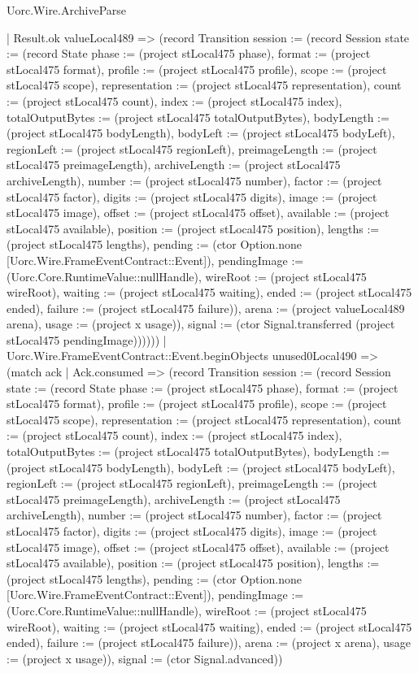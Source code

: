 \begin{lexlean}{Uorc.Wire.ArchiveParse}
\begin{semanticmodule}
{            | Result.ok valueLocal489 => (record Transition {session := (record Session {state := (record State {phase := (project stLocal475 phase), format := (project stLocal475 format), profile := (project stLocal475 profile), scope := (project stLocal475 scope), representation := (project stLocal475 representation), count := (project stLocal475 count), index := (project stLocal475 index), totalOutputBytes := (project stLocal475 totalOutputBytes), bodyLength := (project stLocal475 bodyLength), bodyLeft := (project stLocal475 bodyLeft), regionLeft := (project stLocal475 regionLeft), preimageLength := (project stLocal475 preimageLength), archiveLength := (project stLocal475 archiveLength), number := (project stLocal475 number), factor := (project stLocal475 factor), digits := (project stLocal475 digits), image := (project stLocal475 image), offset := (project stLocal475 offset), available := (project stLocal475 available), position := (project stLocal475 position), lengths := (project stLocal475 lengths), pending := (ctor Option.none [Uorc.Wire.FrameEventContract::Event]), pendingImage := (Uorc.Core.RuntimeValue::nullHandle), wireRoot := (project stLocal475 wireRoot), waiting := (project stLocal475 waiting), ended := (project stLocal475 ended), failure := (project stLocal475 failure)}), arena := (project valueLocal489 arena), usage := (project x usage)}), signal := (ctor Signal.transferred (project stLocal475 pendingImage))}))))
        | Uorc.Wire.FrameEventContract::Event.beginObjects unused0Local490 => (match ack
          | Ack.consumed => (record Transition {session := (record Session {state := (record State {phase := (project stLocal475 phase), format := (project stLocal475 format), profile := (project stLocal475 profile), scope := (project stLocal475 scope), representation := (project stLocal475 representation), count := (project stLocal475 count), index := (project stLocal475 index), totalOutputBytes := (project stLocal475 totalOutputBytes), bodyLength := (project stLocal475 bodyLength), bodyLeft := (project stLocal475 bodyLeft), regionLeft := (project stLocal475 regionLeft), preimageLength := (project stLocal475 preimageLength), archiveLength := (project stLocal475 archiveLength), number := (project stLocal475 number), factor := (project stLocal475 factor), digits := (project stLocal475 digits), image := (project stLocal475 image), offset := (project stLocal475 offset), available := (project stLocal475 available), position := (project stLocal475 position), lengths := (project stLocal475 lengths), pending := (ctor Option.none [Uorc.Wire.FrameEventContract::Event]), pendingImage := (Uorc.Core.RuntimeValue::nullHandle), wireRoot := (project stLocal475 wireRoot), waiting := (project stLocal475 waiting), ended := (project stLocal475 ended), failure := (project stLocal475 failure)}), arena := (project x arena), usage := (project x usage)}), signal := (ctor Signal.advanced)})
}
\end{semanticmodule}
\end{lexlean}

